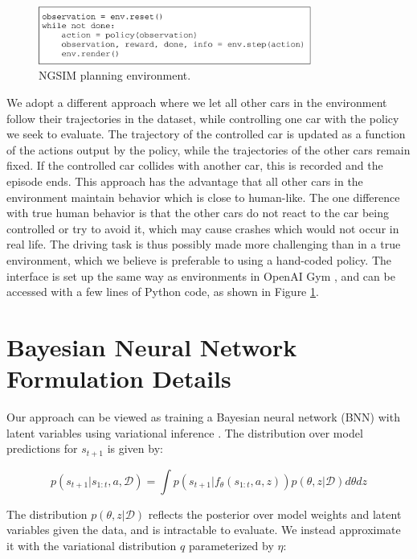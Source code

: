 \documentclass{article} %
\begin{document}
\begin{figure}
  \centering
  \includegraphics[width=0.8\textwidth]{figures/driving/traffic_gym_code-crop.pdf}
  \caption{NGSIM planning environment.}
\label{interface}
\end{figure}


We adopt a different approach where we let all other cars in the environment follow their trajectories in the dataset, while controlling one car with the policy we seek to evaluate.
The trajectory of the controlled car is updated as a function of the actions output by the policy, while the trajectories of the other cars remain fixed.
If the controlled car collides with another car, this is recorded and the episode ends.
This approach has the advantage that all other cars in the environment maintain behavior which is close to human-like.
The one difference with true human behavior is that the other cars do not react to the car being controlled or try to avoid it, which may cause crashes which would not occur in real life.
The driving task is thus possibly made more challenging than in a true environment, which we believe is preferable to using a hand-coded policy.
The interface is set up the same way as environments in OpenAI Gym \citep{OpenAIBaselines}, and can be accessed with a few lines of Python code, as shown in Figure \ref{interface}.



\section{Bayesian Neural Network Formulation Details}
\label{bnn-details}

Our approach can be viewed as training a Bayesian neural network (BNN) \citep{Neal1995} with latent variables using variational inference \citep{Jordan1999, VAE}. 
The distribution over model predictions for $s_{t+1}$ is given by:

\begin{equation*}
  p(s_{t+1} | s_{1:t}, a, \mathcal{D}) = \int p(s_{t+1} | f_\theta(s_{1:t}, a, z)) p(\theta, z | \mathcal{D}) d\theta dz
\end{equation*}

The distribution $p(\theta, z | \mathcal{D})$ reflects the posterior over model weights and latent variables given the data, and is intractable to evaluate.
We instead approximate it with the variational distribution $q$ parameterized by $\eta$:
\end{document}
